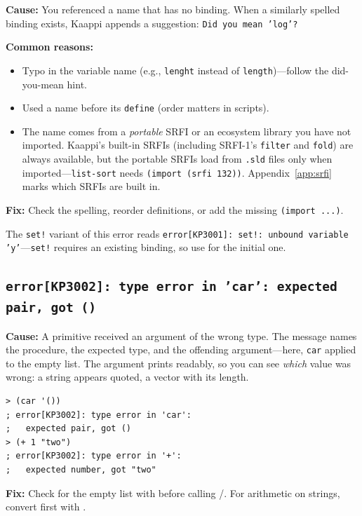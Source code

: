 \textbf{Cause:} You referenced a name that has no binding. When a similarly spelled binding exists, Kaappi appends a suggestion: \texttt{Did you mean 'log'?}

\textbf{Common reasons:}
\begin{itemize}
    \item Typo in the variable name (e.g., \texttt{lenght} instead of \texttt{length})---follow the did-you-mean hint.
    \item Used a name before its \texttt{define} (order matters in scripts).
    \item The name comes from a \emph{portable} SRFI or an ecosystem library you have not imported. Kaappi's \srfibuiltin{} built-in SRFIs (including SRFI-1's \texttt{filter} and \texttt{fold}) are always available, but the \srfiportable{} portable SRFIs load from \texttt{.sld} files only when imported---\texttt{list-sort} needs \texttt{(import (srfi 132))}. Appendix~\ref{app:srfi} marks which SRFIs are built in.
\end{itemize}

\textbf{Fix:} Check the spelling, reorder definitions, or add the missing \texttt{(import ...)}.

The \texttt{set!} variant of this error reads \texttt{error[KP3001]: set!: unbound variable 'y'}---\texttt{set!} requires an existing binding, so use  for the initial one.

\subsection{\texttt{error[KP3002]: type error in 'car': expected pair, got ()}}

\textbf{Cause:} A primitive received an argument of the wrong type. The message names the procedure, the expected type, and the offending argument---here, \texttt{car} applied to the empty list. The argument prints readably, so you can see \emph{which} value was wrong: a string appears quoted, a vector with its length.

\begin{lstlisting}[style=repl]
> (car '())
; error[KP3002]: type error in 'car':
;   expected pair, got ()
> (+ 1 "two")
; error[KP3002]: type error in '+':
;   expected number, got "two"
\end{lstlisting}

\textbf{Fix:} Check for the empty list with  before calling /. For arithmetic on strings, convert first with .

